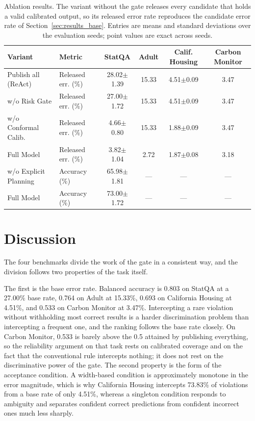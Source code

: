 \documentclass[preprint,12pt,authoryear]{elsarticle}
\begin{document}
\begin{table}[t]
\centering
\scriptsize
\caption{Ablation results. The variant without the gate releases every candidate that holds a valid calibrated output, so its released error rate reproduces the candidate error rate of Section~\ref{sec:results_base}. Entries are means and standard deviations over the evaluation seeds; point values are exact across seeds.}
\label{tab:ablation_results}
\setlength{\tabcolsep}{3pt}
\begin{tabularx}{\linewidth}{@{}llcccc@{}}
\toprule
\textbf{Variant} & \textbf{Metric} & \textbf{StatQA} & \textbf{Adult} & \textbf{Calif. Housing} & \textbf{Carbon Monitor}\\
\midrule
Publish all (ReAct) & Released err. (\%) & 28.02$\pm$1.39 & 15.33 & 4.51$\pm$0.09 & 3.47\\
w/o Risk Gate & Released err. (\%) & 27.00$\pm$1.72 & 15.33 & 4.51$\pm$0.09 & 3.47\\
w/o Conformal Calib. & Released err. (\%) & 4.66$\pm$0.80 & 15.33 & 1.88$\pm$0.09 & 3.47\\
Full Model & Released err. (\%) & 3.82$\pm$1.04 & 2.72 & 1.87$\pm$0.08 & 3.18\\
\midrule
w/o Explicit Planning & Accuracy (\%) & 65.98$\pm$1.81 & --- & --- & ---\\
Full Model & Accuracy (\%) & 73.00$\pm$1.72 & --- & --- & ---\\
\bottomrule
\end{tabularx}
\end{table}

\section{Discussion}
\label{sec:results_discussion}

The four benchmarks divide the work of the gate in a consistent way, and the division follows two properties of the task itself.

The first is the base error rate.
Balanced accuracy is 0.803 on StatQA at a 27.00\% base rate, 0.764 on Adult at 15.33\%, 0.693 on California Housing at 4.51\%, and 0.533 on Carbon Monitor at 3.47\%.
Intercepting a rare violation without withholding most correct results is a harder discrimination problem than intercepting a frequent one, and the ranking follows the base rate closely.
On Carbon Monitor, 0.533 is barely above the 0.5 attained by publishing everything, so the reliability argument on that task rests on calibrated coverage and on the fact that the conventional rule intercepts nothing; it does not rest on the discriminative power of the gate.
The second property is the form of the acceptance condition.
A width-based condition is approximately monotone in the error magnitude, which is why California Housing intercepts 73.83\% of violations from a base rate of only 4.51\%, whereas a singleton condition responds to ambiguity and separates confident correct predictions from confident incorrect ones much less sharply.
\end{document}
